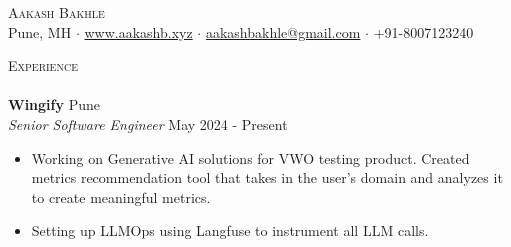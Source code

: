 \documentclass[a4paper]{article}
\newcommand{\lineunder} {
    \vspace*{-8pt} \\
    \hspace*{-18pt} \hrulefill \\
}
\newcommand{\header} [1] {
    {\hspace*{-18pt}\vspace*{6pt} \textsc{#1}}
    \vspace*{-6pt} \lineunder
}
\begin{document}
\vspace*{-40pt}



\vspace*{-10pt}
\begin{center}
    {\Huge \scshape {Aakash Bakhle}}\\
    Pune, MH $\cdot$ \href{https://www.aakashb.xyz}{www.aakashb.xyz} $\cdot$ \href{mailto:aakashbakhle@gmail.com}{aakashbakhle@gmail.com} $\cdot$ +91-8007123240 
\end{center}


\header{Experience}
\vspace{1mm}
\textbf{Wingify} \hfill Pune\\
\textit{Senior Software Engineer} \hfill May 2024 - Present\\
\vspace{-1mm}
\begin{itemize} \itemsep 1pt
    \item Working on Generative AI solutions for VWO testing product. Created metrics recommendation tool that takes in the user's domain and analyzes it to create meaningful metrics.
    \item Setting up LLMOps using Langfuse to instrument all LLM calls.
\end{itemize}

\vspace*{2mm}
\end{document}
